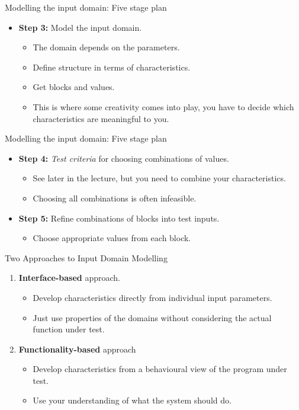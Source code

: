\documentclass{beamer}
\begin{document}
\begin{frame}{Modelling the input domain: Five stage plan}
  \begin{itemize}
  \item {\bf Step 3:} Model the input domain.
    \begin{itemize}
    \item The domain depends on the parameters.
    \item Define structure in terms of characteristics.
    \item Get blocks and values.
    \item This is where some creativity comes into play, you have to
      decide which characteristics are meaningful to you. 
    \end{itemize}
  \end{itemize}
\end{frame}
\begin{frame}{Modelling the input domain: Five stage plan}
  \begin{itemize}
  \item {\bf Step 4:} {\it Test criteria} for choosing combinations of values.
    \begin{itemize}
    \item See later in the lecture, but you need to combine your
      characteristics.
    \item Choosing all combinations is often infeasible.
    \end{itemize}
  \item {\bf Step 5:} Refine combinations of blocks into test inputs.
    \begin{itemize}
    \item Choose appropriate values from each block.
    \end{itemize}
  \end{itemize}
\end{frame}
\begin{frame}{Two Approaches to Input Domain Modelling}
  \begin{enumerate}
  \item {\bf Interface-based} approach.
    \begin{itemize}
    \item Develop characteristics directly from individual input
      parameters.
    \item Just use properties of the domains without considering the
      actual function under test.
    \end{itemize}
  \item {\bf Functionality-based} approach
    \begin{itemize}
    \item Develop characteristics from a behavioural view of the
      program under test.
    \item Use your understanding of what the system should do. 
    \end{itemize}
  \end{enumerate}
  
\end{frame}
\end{document}
